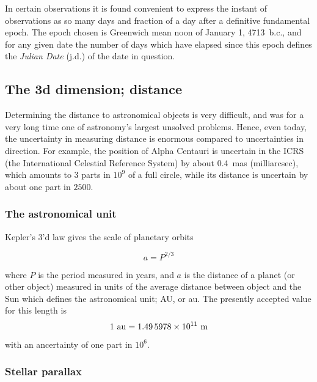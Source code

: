In certain observations it is found convenient to express the instant of observations
as so many days and fraction of a day after a definitive fundamental epoch. The epoch
chosen is Greenwich mean noon of January 1, 4713~{\sc b.c.}, and for any given date the
number of days which have elapsed since this epoch defines the {\it Julian Date} 
({\sc j.d.}) of the date in question.

\subsection{The 3d dimension; distance}

Determining the distance to astronomical objects is very difficult, and was for a very
long time one of astronomy's largest unsolved problems. Hence, even today, the uncertainty 
in measuring distance is enormous compared to uncertainties in direction. For example,
the position of Alpha Centauri is uncertain in the ICRS (the International Celestial Reference
System) by about 0.4~mas (milliarcsec), which amounts to 3 parts in $10^9$ of a full circle, while
its distance is uncertain by about one part in $2500$. 

\subsubsection{The astronomical unit}

Kepler's 3'd law gives the scale of planetary orbits

\[ a=P^{2/3} \]

where $P$ is the period measured in years, and $a$ is the distance of a planet (or other object) 
measured in units of the average distance between object and the Sun which defines the 
astronomical unit; AU, or au. The presently accepted value for this length is
\[ 1~{\rm au}=1.49\,5978\times 10^{11}~{\rm m} \]
with an ancertainty of one part in $10^6$.

\subsubsection{Stellar parallax}

